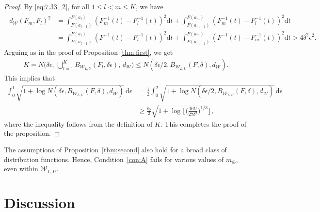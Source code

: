 \documentclass[11pt]{article}
\numberwithin{equation}{section}
\newcommand{\W}{\mathcal{W}}
\begin{document}
\begin{proof}
    By \eqref{eq:7.33_2}, for all $1\leq l<m\leq K$, we have
    \begin{align}\begin{split} \label{eq:7.33_3}
        d_{\mathcal{W}} \left( F_m,  F_l \right)^2
        & = \int_{F(a_{l-1})}^{F(a_l)} \left( F^{-1}_m(t) - F_l^{-1}(t) \right)^2 \mathrm{d}t + \int_{F(a_{m-1})}^{F(a_m)} \left( F^{-1}_m(t) - F_l^{-1}(t) \right)^2 \mathrm{d}t \\
        & = \int_{F(a_{l-1})}^{F(a_l)} \left( F^{-1}(t) - F_l^{-1}(t) \right)^2 \mathrm{d}t + \int_{F(a_{m-1})}^{F(a_m)} \left( F^{-1}(t) - F_m^{-1}(t) \right)^2 \mathrm{d}t > 4 \delta^2 \epsilon^2.
    \end{split} \end{align}
    Arguing as in the proof of Proposition \ref{thm:first}, we get
    \begin{align*}
        K=N\Big(\delta\epsilon,\,\bigcup_{l=1}^K B_{\mathcal{W}_{L, U}}(F_l, \delta \epsilon),\,d_{\mathcal{W}}\Big) \le N(\delta\epsilon/2,B_{\mathcal{W}_{L, U}}(F, \delta),d_{\mathcal{W}}).
    \end{align*}
    This implies that
    \begin{align*}
        \int_{0}^{1} \sqrt{1+\log N(\delta \epsilon, B_{\mathcal{W}_{L, U}}(F, \delta), d_{\mathcal{W}})} \, \mathrm{d} \epsilon
        &= \frac{1}{2} \int_{0}^2 \sqrt{1+\log N(\delta \epsilon/2, B_{\mathcal{W}_{L, U}}(F, \delta), d_{\mathcal{W}})} \, \mathrm{d} \epsilon \\
        &\ge \frac{\epsilon_0}{2}\sqrt{1+\log\Big\lfloor\Big(\frac{16U}{27\delta^2}\Big)^{1/3}\Big\rfloor},
    \end{align*}
    where the inequality follows from the definition of $K$. This completes the proof of the proposition.
\end{proof}

The assumptions of Proposition~\ref{thm:second} also hold for a broad
class of distribution functions. Hence, Condition~\ref{con:A} fails for various values of \(m_\oplus\), even within \(\W_{L,U}\).

\section{Discussion}\label{sec:discussion}
\end{document}
